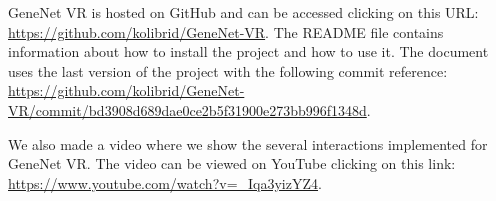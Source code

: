 GeneNet VR is hosted on GitHub and can be accessed clicking on this URL: \url{https://github.com/kolibrid/GeneNet-VR}. The README file contains information about how to install the project and how to use it. The document uses the last version of the project with the following commit reference: \url{https://github.com/kolibrid/GeneNet-VR/commit/bd3908d689dae0ce2b5f31900e273bb996f1348d}.

We also made a video where we show the several interactions implemented for GeneNet VR. The video can be viewed on YouTube clicking on this link: \url{https://www.youtube.com/watch?v=\_Iqa3yizYZ4}.
